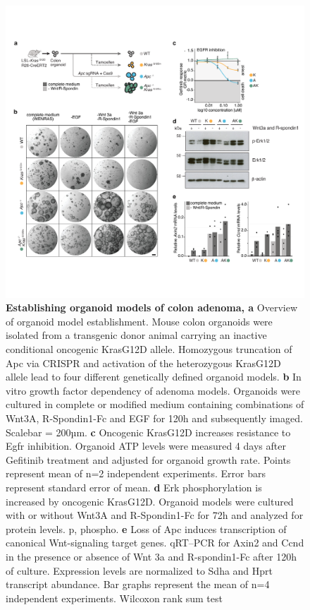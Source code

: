 \begin{flushleft}
\begin{figure}[H]
\centering
\includegraphics[width=\textwidth,
                height=\textheight,
                keepaspectratio]{figures/adenomaprofiling/pdf/fig_1_0.pdf}
\caption{\textbf{Establishing organoid models of colon adenoma, a} Overview of organoid model establishment. Mouse colon organoids were isolated from a transgenic donor animal carrying an inactive conditional oncogenic KrasG12D allele. Homozygous truncation of Apc via CRISPR and activation of the heterozygous KrasG12D allele lead to four different genetically defined organoid models.
\textbf{b} In vitro growth factor dependency of adenoma models. Organoids were cultured in complete or modified medium containing combinations of Wnt3A, R-Spondin1-Fc and EGF for 120h and subsequently imaged. Scalebar = 200µm.
\textbf{c}	Oncogenic KrasG12D increases resistance to Egfr inhibition. Organoid ATP levels were measured 4 days after Gefitinib treatment and adjusted for organoid growth rate. Points represent mean of n=2 independent experiments. Error bars represent standard error of mean.
\textbf{d} Erk phosphorylation is increased by oncogenic KrasG12D. Organoid models were cultured with or without Wnt3A and R-Spondin1-Fc for 72h and analyzed for protein levels. p, phospho.   
\textbf{e}	Loss of Apc induces transcription of canonical Wnt-signaling target genes. qRT–PCR for Axin2 and Ccnd in the presence or absence of Wnt 3a and R-spondin1-Fc after 120h of culture. Expression levels are normalized to Sdha and Hprt transcript abundance. Bar graphs represent the mean of n=4 independent experiments. Wilcoxon rank sum test 
}
\label{fig_a10}
\end{figure}
\bigbreak


\end{flushleft}
